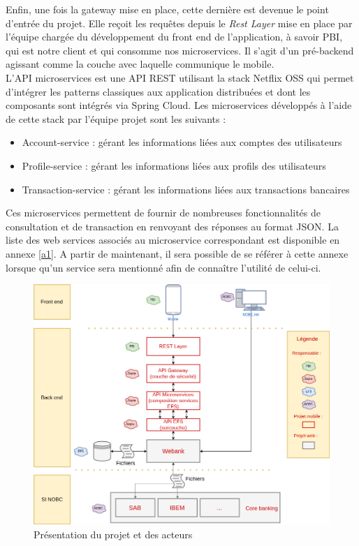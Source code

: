 	Enfin, une fois la gateway mise en place, cette dernière est devenue le point d'entrée du projet. Elle reçoit les requêtes depuis le \textit{Rest Layer} mise en place par l'équipe chargée du développement du front end de l'application, à savoir PBI, qui est notre client et qui consomme nos microservices. Il s'agit d'un pré-backend agissant comme la couche avec laquelle communique le mobile.\\

	L'API microservices est une API REST utilisant la stack Netflix OSS qui permet d'intégrer les patterns classiques aux application distribuées et dont les composants sont intégrés via Spring Cloud. Les microservices développés à l'aide de cette stack par l'équipe projet sont les suivants :\\

\begin{itemize}
			\item Account-service : gérant les informations liées aux comptes des utilisateurs
			\item Profile-service : gérant les informations liées aux profils des utilisateurs
			\item Transaction-service : gérant les informations liées aux transactions bancaires \\
\end{itemize}

	Ces microservices permettent de fournir de nombreuses fonctionnalités de consultation et de transaction en renvoyant des réponses au format JSON. La liste des web services associés au microservice correspondant est disponible en annexe \ref{a1}. A partir de maintenant, il sera possible de se référer à cette annexe lorsque qu'un service sera mentionné afin de connaître l'utilité de celui-ci.
	
\begin{figure}[H]
\raggedleft
	\includegraphics[scale=0.45]{images/travailNeuflizeOBC/architecture/archiFonc.png}
	\centering
	\caption{Présentation du projet et des acteurs}
	\label{archiFonc}
\end{figure}